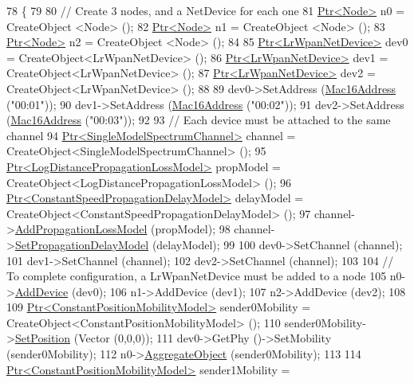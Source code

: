 \begin{DoxyCode}
78 \{
79 
80   \textcolor{comment}{// Create 3 nodes, and a NetDevice for each one}
81   \hyperlink{classns3_1_1Ptr}{Ptr<Node>} n0 = CreateObject <Node> ();
82   \hyperlink{classns3_1_1Ptr}{Ptr<Node>} n1 = CreateObject <Node> ();
83   \hyperlink{classns3_1_1Ptr}{Ptr<Node>} n2 = CreateObject <Node> ();
84 
85   \hyperlink{classns3_1_1Ptr}{Ptr<LrWpanNetDevice>} dev0 = CreateObject<LrWpanNetDevice> ();
86   \hyperlink{classns3_1_1Ptr}{Ptr<LrWpanNetDevice>} dev1 = CreateObject<LrWpanNetDevice> ();
87   \hyperlink{classns3_1_1Ptr}{Ptr<LrWpanNetDevice>} dev2 = CreateObject<LrWpanNetDevice> ();
88 
89   dev0->SetAddress (\hyperlink{classns3_1_1Mac16Address}{Mac16Address} (\textcolor{stringliteral}{"00:01"}));
90   dev1->SetAddress (\hyperlink{classns3_1_1Mac16Address}{Mac16Address} (\textcolor{stringliteral}{"00:02"}));
91   dev2->SetAddress (\hyperlink{classns3_1_1Mac16Address}{Mac16Address} (\textcolor{stringliteral}{"00:03"}));
92 
93   \textcolor{comment}{// Each device must be attached to the same channel}
94   \hyperlink{classns3_1_1Ptr}{Ptr<SingleModelSpectrumChannel>} channel = 
      CreateObject<SingleModelSpectrumChannel> ();
95   \hyperlink{classns3_1_1Ptr}{Ptr<LogDistancePropagationLossModel>} propModel = 
      CreateObject<LogDistancePropagationLossModel> ();
96   \hyperlink{classns3_1_1Ptr}{Ptr<ConstantSpeedPropagationDelayModel>} delayModel = 
      CreateObject<ConstantSpeedPropagationDelayModel> ();
97   channel->\hyperlink{classns3_1_1SingleModelSpectrumChannel_a3d8c68e54e0e7659fdf715260d5613ac}{AddPropagationLossModel} (propModel);
98   channel->\hyperlink{classns3_1_1SingleModelSpectrumChannel_afd757c085623596ebf3da8264cfbaa45}{SetPropagationDelayModel} (delayModel);
99 
100   dev0->SetChannel (channel);
101   dev1->SetChannel (channel);
102   dev2->SetChannel (channel);
103 
104   \textcolor{comment}{// To complete configuration, a LrWpanNetDevice must be added to a node}
105   n0->\hyperlink{classns3_1_1Node_a42ff83ee1d5d1649c770d3f5b62375de}{AddDevice} (dev0);
106   n1->AddDevice (dev1);
107   n2->AddDevice (dev2);
108 
109   \hyperlink{classns3_1_1Ptr}{Ptr<ConstantPositionMobilityModel>} sender0Mobility = 
      CreateObject<ConstantPositionMobilityModel> ();
110   sender0Mobility->\hyperlink{classns3_1_1MobilityModel_ac584b3d5a309709d2f13ed6ada1e7640}{SetPosition} (Vector (0,0,0));
111   dev0->GetPhy ()->SetMobility (sender0Mobility);
112   n0->\hyperlink{classns3_1_1Object_a79dd435d300f3deca814553f561a2922}{AggregateObject} (sender0Mobility);
113 
114   \hyperlink{classns3_1_1Ptr}{Ptr<ConstantPositionMobilityModel>} sender1Mobility = 

\end{DoxyCode}
